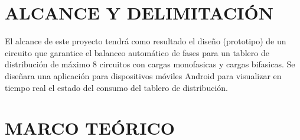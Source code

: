 \documentclass[12pt,letterpaper]{article}
\begin{document}
\section{ALCANCE Y DELIMITACIÓN}
El alcance de este proyecto tendrá como resultado el diseño (prototipo) de un circuito que garantice el balanceo automático de fases para un tablero de distribución de máximo 8 circuitos con cargas monofasicas y cargas bifasicas. Se diseñara una aplicación para  dispositivos  móviles  Android para visualizar en tiempo real el estado del consumo del tablero de distribución. 	    

\section{MARCO TEÓRICO}
\end{document}
